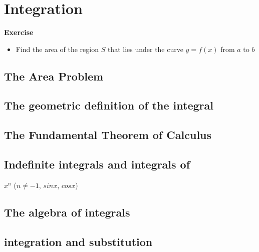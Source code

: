 \documentclass[]{book}
\providecommand{\tightlist}{%
  \setlength{\itemsep}{0pt}\setlength{\parskip}{0pt}}
\begin{document}
\newpage

\hypertarget{integration}{%
\section{Integration}\label{integration}}

\textbf{Exercise}

\begin{itemize}
\tightlist
\item
  Find the area of the region \(S\) that lies under the curve \(y=f(x)\) from \(a\) to \(b\)
\end{itemize}

\hypertarget{the-area-problem}{%
\subsection{The Area Problem}\label{the-area-problem}}

\hypertarget{the-geometric-definition-of-the-integral}{%
\subsection{The geometric definition of the integral}\label{the-geometric-definition-of-the-integral}}

\hypertarget{the-fundamental-theorem-of-calculus}{%
\subsection{The Fundamental Theorem of Calculus}\label{the-fundamental-theorem-of-calculus}}

\hypertarget{indefinite-integrals-and-integrals-of}{%
\subsection{Indefinite integrals and integrals of}\label{indefinite-integrals-and-integrals-of}}

\(x^n\) (\(n\neq-1\), \(sin x\), \(cos x\))

\hypertarget{the-algebra-of-integrals}{%
\subsection{The algebra of integrals}\label{the-algebra-of-integrals}}

\hypertarget{integration-and-substitution}{%
\subsection{integration and substitution}\label{integration-and-substitution}}
\end{document}
